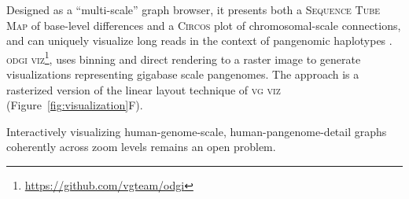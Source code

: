 Designed as a ``multi-scale'' graph browser, it presents both a \textsc{Sequence Tube Map} of base-level differences and a \textsc{Circos} \cite{Krzywinski_2009_Circos} plot of chromosomal-scale connections, and can uniquely visualize long reads in the context of pangenomic haplotypes \cite{yokoyama_momi-g:_2019}.
\textsc{odgi viz}\footnote{\url{https://github.com/vgteam/odgi}}, uses binning and direct rendering to a raster image to generate visualizations representing gigabase scale pangenomes. %
The approach is a rasterized version of the linear layout technique of \textsc{vg viz} \citep{Garrison_2019} (Figure~\ref{fig:visualization}F). %



Interactively visualizing human-genome-scale, human-pangenome-detail graphs coherently across zoom levels remains an open problem.



%


